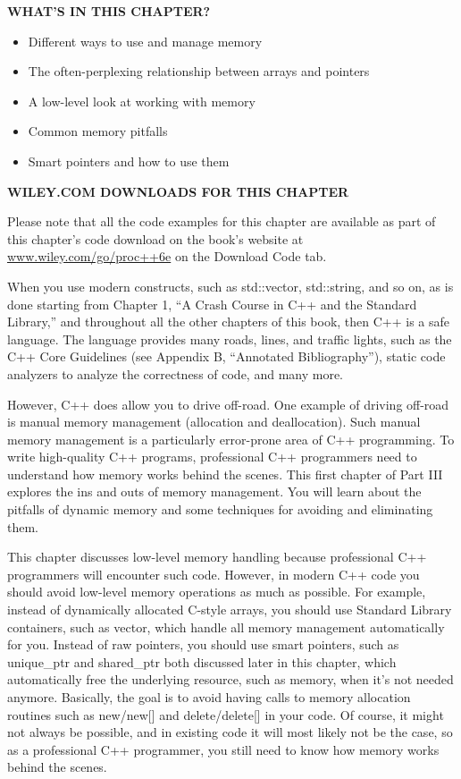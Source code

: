 \noindent
\textbf{WHAT’S IN THIS CHAPTER?}

\begin{itemize}
\item
Different ways to use and manage memory

\item
The often-perplexing relationship between arrays and pointers

\item
A low-level look at working with memory

\item
Common memory pitfalls

\item
Smart pointers and how to use them
\end{itemize}

\noindent
\textbf{WILEY.COM DOWNLOADS FOR THIS CHAPTER}

Please note that all the code examples for this chapter are available as part of this chapter’s code download on the book’s website at \url{www.wiley.com/go/proc++6e} on the Download Code tab.

When you use modern constructs, such as std::vector, std::string, and so on, as is done starting from Chapter 1, “A Crash Course in C++ and the Standard Library,” and throughout all the other chapters of this book, then C++ is a safe language. The language provides many roads, lines, and traffic lights, such as the C++ Core Guidelines (see Appendix B, “Annotated Bibliography”), static code analyzers to analyze the correctness of code, and many more.

However, C++ does allow you to drive off-road. One example of driving off-road is manual memory management (allocation and deallocation). Such manual memory management is a particularly error-prone area of C++ programming. To write high-quality C++ programs, professional C++ programmers need to understand how memory works behind the scenes. This first chapter of Part III explores the ins and outs of memory management. You will learn about the pitfalls of dynamic memory and some techniques for avoiding and eliminating them.

This chapter discusses low-level memory handling because professional C++ programmers will encounter such code. However, in modern C++ code you should avoid low-level memory operations as much as possible. For example, instead of dynamically allocated C-style arrays, you should use Standard Library containers, such as vector, which handle all memory management automatically for you. Instead of raw pointers, you should use smart pointers, such as unique_ptr and shared_ptr both discussed later in this chapter, which automatically free the underlying resource, such as memory, when it’s not needed anymore. Basically, the goal is to avoid having calls to memory allocation routines such as new/new[] and delete/delete[] in your code. Of course, it might not always be possible, and in existing code it will most likely not be the case, so as a professional C++ programmer, you still need to know how memory works behind the scenes.

